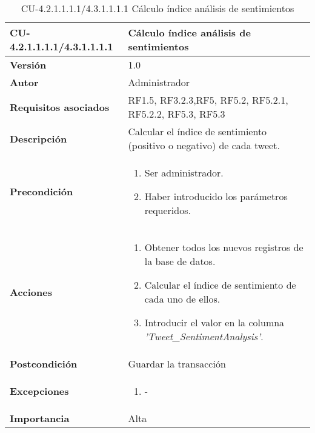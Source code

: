 \begin{table}[h!]
	\centering
	\begin{tabularx}{\linewidth}{ p{} p{} }
		\toprule
		\textbf{CU-4.2.1.1.1.1/4.3.1.1.1.1}    & \textbf{Cálculo índice análisis de sentimientos}\\
		\toprule
		\textbf{Versión}              & 1.0    \\
		\textbf{Autor}                & Administrador \\
		\textbf{Requisitos asociados} & RF1.5, RF3.2.3,RF5, RF5.2, RF5.2.1, RF5.2.2, RF5.3, RF5.3\\
		\textbf{Descripción}          & Calcular el índice de sentimiento (positivo o negativo) de cada tweet.\\
        \textbf{Precondición}         &  
  	\begin{enumerate}
			\def\labelenumi{\arabic{enumi}.}
			\tightlist
			\item Ser administrador.
            \item Haber introducido los parámetros requeridos.
		\end{enumerate}\\
		\textbf{Acciones}             &
		\begin{enumerate}
			\def\labelenumi{\arabic{enumi}.}
			\tightlist
            \item Obtener todos los nuevos registros de la base de datos.
            \item Calcular el índice de sentimiento de cada uno de ellos.
            \item Introducir el valor en la columna \textit{'Tweet_SentimentAnalysis'}.
		  \end{enumerate}\\
            
		\textbf{Postcondición}     &   Guardar la transacción \\
		\textbf{Excepciones}          & 
        \begin{enumerate}
            \def\labelenumi{\arabic{enumi}.}
            \tightlist
            \item -
		\end{enumerate}\\
		\textbf{Importancia}          & Alta\\
		\bottomrule
	\end{tabularx}
	\caption{CU-4.2.1.1.1.1/4.3.1.1.1.1 Cálculo índice análisis de sentimientos}
\end{table}
